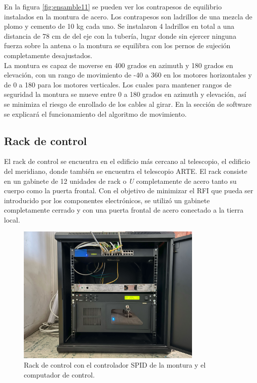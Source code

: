 En la figura \ref{fig:ensamble11} se pueden ver los contrapesos de equilibrio instalados en la montura de acero. Los contrapesos son ladrillos de una mezcla de plomo y cemento de 10 kg cada uno. Se instalaron 4 ladrillos en total a una distancia de 78 cm de del eje con la tubería, lugar donde sin ejercer ninguna fuerza sobre la antena o la montura se equilibra con los pernos de sujeción completamente desajustados.\\

La montura es capaz de moverse en 400 grados en azimuth y 180 grados en elevación, con un rango de movimiento de -40 a 360 en los motores horizontales y de 0 a 180 para los motores verticales. Los cuales para mantener rangos de seguridad la montura se mueve entre 0 a 180 grados en azimuth y elevación, así se minimiza el riesgo de enrollado de los cables al girar. En la sección de software se explicará el funcionamiento del algoritmo de movimiento.\\

\subsection{Rack de control}

El rack de control se encuentra en el edificio más cercano al telescopio, el edificio del meridiano, donde también se encuentra el telescopio ARTE. El rack consiste en un gabinete de 12 unidades de rack o \textit{U} completamente de acero tanto su cuerpo como la puerta frontal. Con el objetivo de minimizar el RFI que pueda ser introducido por los componentes electrónicos, se utilizó un gabinete completamente cerrado y con una puerta frontal de acero conectado a la tierra local.\\


\begin{figure}
    \centering
    \includegraphics[width=0.8\textwidth]{img/rack}
    \caption{Rack de control con el controlador SPID de la montura y el computador de control.}
    \label{fig:ensamble12}
\end{figure}

